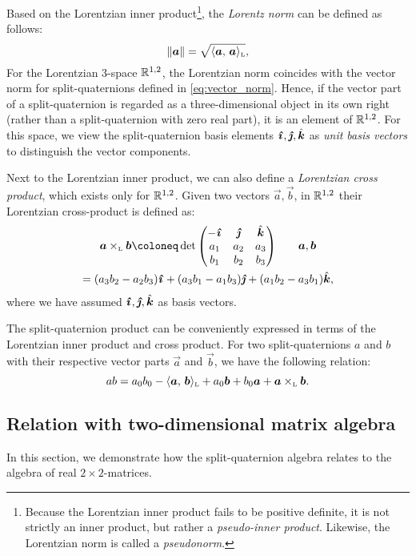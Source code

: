 Based on the Lorentzian inner product\footnote
{
    Because the Lorentzian inner product fails to be positive definite, it is not strictly an inner product, but rather a \emph{pseudo-inner product}. Likewise, the Lorentzian norm is called a \emph{pseudonorm}.
}, the \emph{Lorentz norm} can be defined as follows:
\begin{equation}
    \norm{\vec{a}} = \sqrt{\lorinner{\vec{a}}{\vec{a}}},
\end{equation}
For the Lorentzian 3-space $\mathbb{R}^{1, 2}$, the Lorentzian norm coincides with the vector norm for split-quaternions defined in \cref{eq:vector_norm}. Hence, if the vector part of a split-quaternion is regarded as a three-dimensional object in its own right (rather than a split-quaternion with zero real part), it is an element of $\mathbb{R}^{1, 2}$. For this space, we view the split-quaternion basis elements $\quati, \quatj, \quatk$ as \emph{unit basis vectors} to distinguish the vector components.

Next to the Lorentzian inner product, we can also define a \emph{Lorentzian cross product}, which exists only for $\mathbb{R}^{1, 2}$. Given two vectors $\vec{a}, \vec{b}$, in $\mathbb{R}^{1, 2}$
their Lorentzian cross-product is defined as: \cite{Jafari2014}
\begin{gather}
        \lorcrossp{\vec{a}}{\vec{b}} \coloneq \det\mqty(-\quati & \quatj & \quatk \\ a_1 & a_2 & a_3 \\ b_1 & b_2 & b_3) \qquad \vec{a}, \vec{b} \\
            = \qty(a_3b_2 - a_2b_3)\quati + \qty(a_3b_1 - a_1b_3)\quatj + \qty(a_1b_2 - a_3b_1)\quatk,
\end{gather}
where we have assumed $\quati, \quatj, \quatk$ as basis vectors.

The split-quaternion product can be conveniently expressed in terms of the Lorentzian inner product and cross product. For two split-quaternions $a$ and $b$ with their respective vector parts $\vec{a}$ and $\vec{b}$, we have the following relation:
\begin{equation}
    ab = a_0 b_0 - \lorinner{\vec{a}}{\vec{b}} + a_0 \vec{b} + b_0 \vec{a} + \lorcrossp{\vec{a}}{\vec{b}}.
\end{equation}

\subsection{Relation with two-dimensional matrix algebra}
\label{ssec:quat_isomorphism}
In this section, we demonstrate how the split-quaternion algebra relates to the algebra of real $2\times2$-matrices.

